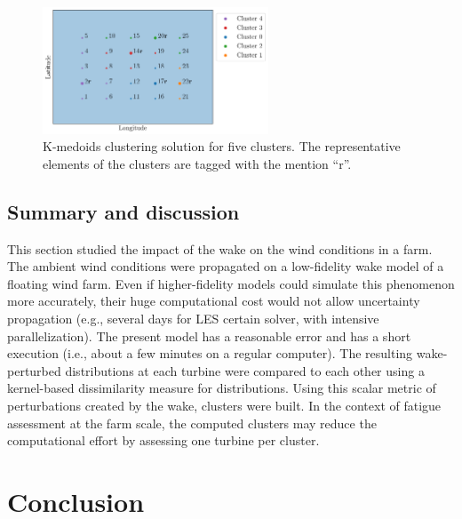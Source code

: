 \begin{figure}
    \centering
    \includegraphics[width=0.6\textwidth]{part2/figures/WAKE/clusters_SB.png}
    \caption{K-medoids clustering solution for five clusters. The representative elements of the clusters are tagged with the mention ``r''.}
    \label{fig:kmedoids}
\end{figure}



\subsection{Summary and discussion}
This section studied the impact of the wake on the wind conditions in a farm. 
The ambient wind conditions were propagated on a low-fidelity wake model of a floating wind farm. 
Even if higher-fidelity models could simulate this phenomenon more accurately, their huge computational cost would not allow uncertainty propagation (e.g., several days for LES certain solver, with intensive parallelization). 
The present model has a reasonable error and has a short execution (i.e., about a few minutes on a regular computer). 
The resulting wake-perturbed distributions at each turbine were compared to each other using a kernel-based dissimilarity measure for distributions. 
Using this scalar metric of perturbations created by the wake, clusters were built.  
In the context of fatigue assessment at the farm scale, the computed clusters may reduce the computational effort by assessing one turbine per cluster.    


\section{Conclusion}


